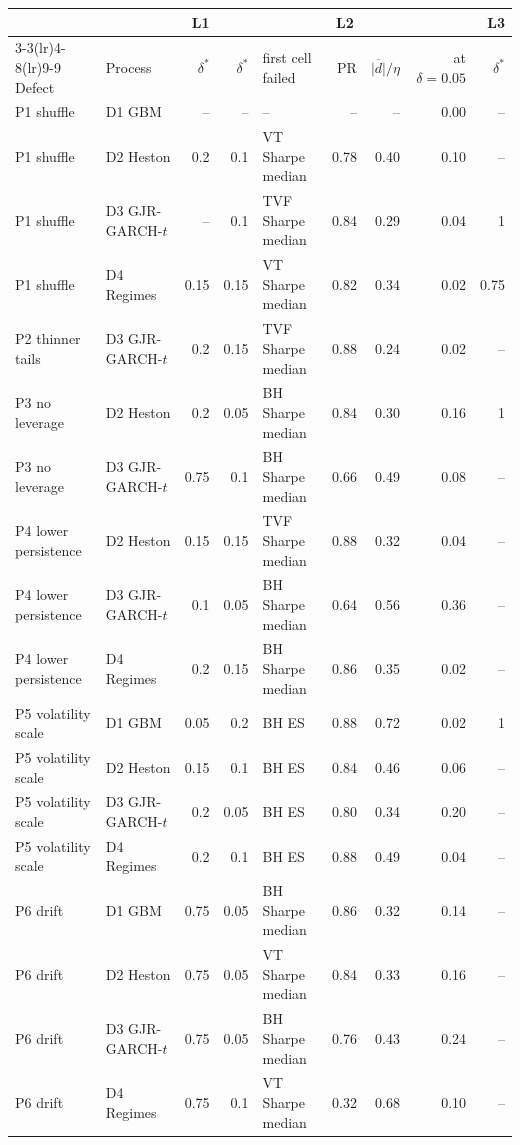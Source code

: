 \begin{tabular}{llrrlrrrr}
\toprule
& & L1 & \multicolumn{5}{c}{L2} & L3 \\
\cmidrule(lr){3-3}\cmidrule(lr){4-8}\cmidrule(lr){9-9}
Defect & Process & $\delta^{*}$ & $\delta^{*}$ & first cell failed & PR & $\overline{|d|}/\eta$ & at $\delta=0.05$ & $\delta^{*}$ \\
\midrule
P1 shuffle & D1 GBM & -- & -- & -- & -- & -- & 0.00 & -- \\
P1 shuffle & D2 Heston & 0.2 & 0.1 & VT Sharpe median & 0.78 & 0.40 & 0.10 & -- \\
P1 shuffle & D3 GJR-GARCH-$t$ & -- & 0.1 & TVF Sharpe median & 0.84 & 0.29 & 0.04 & 1 \\
P1 shuffle & D4 Regimes & 0.15 & 0.15 & VT Sharpe median & 0.82 & 0.34 & 0.02 & 0.75 \\
P2 thinner tails & D3 GJR-GARCH-$t$ & 0.2 & 0.15 & TVF Sharpe median & 0.88 & 0.24 & 0.02 & -- \\
P3 no leverage & D2 Heston & 0.2 & 0.05 & BH Sharpe median & 0.84 & 0.30 & 0.16 & 1 \\
P3 no leverage & D3 GJR-GARCH-$t$ & 0.75 & 0.1 & BH Sharpe median & 0.66 & 0.49 & 0.08 & -- \\
P4 lower persistence & D2 Heston & 0.15 & 0.15 & TVF Sharpe median & 0.88 & 0.32 & 0.04 & -- \\
P4 lower persistence & D3 GJR-GARCH-$t$ & 0.1 & 0.05 & BH Sharpe median & 0.64 & 0.56 & 0.36 & -- \\
P4 lower persistence & D4 Regimes & 0.2 & 0.15 & BH Sharpe median & 0.86 & 0.35 & 0.02 & -- \\
P5 volatility scale & D1 GBM & 0.05 & 0.2 & BH ES & 0.88 & 0.72 & 0.02 & 1 \\
P5 volatility scale & D2 Heston & 0.15 & 0.1 & BH ES & 0.84 & 0.46 & 0.06 & -- \\
P5 volatility scale & D3 GJR-GARCH-$t$ & 0.2 & 0.05 & BH ES & 0.80 & 0.34 & 0.20 & -- \\
P5 volatility scale & D4 Regimes & 0.2 & 0.1 & BH ES & 0.88 & 0.49 & 0.04 & -- \\
P6 drift & D1 GBM & 0.75 & 0.05 & BH Sharpe median & 0.86 & 0.32 & 0.14 & -- \\
P6 drift & D2 Heston & 0.75 & 0.05 & VT Sharpe median & 0.84 & 0.33 & 0.16 & -- \\
P6 drift & D3 GJR-GARCH-$t$ & 0.75 & 0.05 & BH Sharpe median & 0.76 & 0.43 & 0.24 & -- \\
P6 drift & D4 Regimes & 0.75 & 0.1 & VT Sharpe median & 0.32 & 0.68 & 0.10 & -- \\
\bottomrule
\end{tabular}
